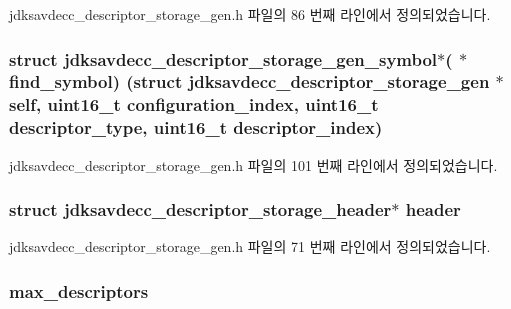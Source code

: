 jdksavdecc\+\_\+descriptor\+\_\+storage\+\_\+gen.\+h 파일의 86 번째 라인에서 정의되었습니다.

\subsubsection[{\texorpdfstring{find\+\_\+symbol}{find_symbol}}]{\setlength{\rightskip}{0pt plus 5cm}struct {\bf jdksavdecc\+\_\+descriptor\+\_\+storage\+\_\+gen\+\_\+symbol}$\ast$( $\ast$ find\+\_\+symbol) (struct {\bf jdksavdecc\+\_\+descriptor\+\_\+storage\+\_\+gen} $\ast$self, uint16\+\_\+t configuration\+\_\+index, uint16\+\_\+t descriptor\+\_\+type, uint16\+\_\+t descriptor\+\_\+index)}\hypertarget{structjdksavdecc__descriptor__storage__gen_a3b00a9c203cc12ca51532823854d850f}{}\label{structjdksavdecc__descriptor__storage__gen_a3b00a9c203cc12ca51532823854d850f}


jdksavdecc\+\_\+descriptor\+\_\+storage\+\_\+gen.\+h 파일의 101 번째 라인에서 정의되었습니다.

\subsubsection[{\texorpdfstring{header}{header}}]{\setlength{\rightskip}{0pt plus 5cm}struct {\bf jdksavdecc\+\_\+descriptor\+\_\+storage\+\_\+header}$\ast$ header}\hypertarget{structjdksavdecc__descriptor__storage__gen_ab8b6411f5cc5bef01477313804777e55}{}\label{structjdksavdecc__descriptor__storage__gen_ab8b6411f5cc5bef01477313804777e55}


jdksavdecc\+\_\+descriptor\+\_\+storage\+\_\+gen.\+h 파일의 71 번째 라인에서 정의되었습니다.

\subsubsection[{\texorpdfstring{max\+\_\+descriptors}{max_descriptors}}]{ max\+\_\+descriptors}\hypertarget{structjdksavdecc__descriptor__storage__gen_ad0b25b9099c457f6a44f01143309e47f}{}\label{structjdksavdecc__descriptor__storage__gen_ad0b25b9099c457f6a44f01143309e47f}


